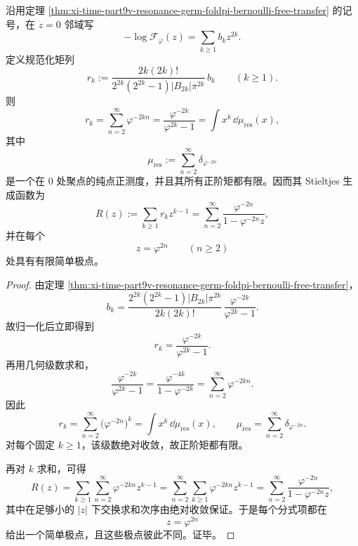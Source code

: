 \begin{theorem}\label{thm:xi-time-part9zb-resonance-purepoint-stieltjes-moment-characterization}
沿用定理 \ref{thm:xi-time-part9v-resonance-germ-foldpi-bernoulli-free-transfer} 的记号，在 \(z=0\) 邻域写
\[
-\log \mathcal F_\varphi(z)=\sum_{k\ge 1}b_k z^{2k}.
\]
定义规范化矩列
\[
r_k:=
\frac{2k(2k)!}{2^{2k}(2^{2k}-1)|B_{2k}|\pi^{2k}}\,b_k
\qquad (k\ge 1).
\]
则
\[
r_k
=
\sum_{n=2}^{\infty}\varphi^{-2kn}
=
\frac{\varphi^{-2k}}{\varphi^{2k}-1}
=
\int x^k\,\dd\mu_{\mathrm{res}}(x),
\]
其中
\[
\mu_{\mathrm{res}}
:=
\sum_{n=2}^{\infty}\delta_{\varphi^{-2n}}
\]
是一个在 \(0\) 处聚点的纯点正测度，并且其所有正阶矩都有限。因而其 Stieltjes 生成函数为
\[
R(z):=\sum_{k\ge 1}r_k z^{k-1}
=
\sum_{n=2}^{\infty}\frac{\varphi^{-2n}}{1-\varphi^{-2n}z},
\]
并在每个
\[
z=\varphi^{2n}
\qquad (n\ge 2)
\]
处具有有限简单极点。
\end{theorem}
\begin{proof}
由定理 \ref{thm:xi-time-part9v-resonance-germ-foldpi-bernoulli-free-transfer}，
\[
b_k=
\frac{2^{2k}(2^{2k}-1)|B_{2k}|\pi^{2k}}{2k(2k)!}\,
\frac{\varphi^{-2k}}{\varphi^{2k}-1}.
\]
故归一化后立即得到
\[
r_k=\frac{\varphi^{-2k}}{\varphi^{2k}-1}.
\]
再用几何级数求和，
\[
\frac{\varphi^{-2k}}{\varphi^{2k}-1}
=
\frac{\varphi^{-4k}}{1-\varphi^{-2k}}
=
\sum_{n=2}^{\infty}\varphi^{-2kn}.
\]
因此
\[
r_k=
\sum_{n=2}^{\infty}\bigl(\varphi^{-2n}\bigr)^k
=
\int x^k\,\dd\mu_{\mathrm{res}}(x),
\qquad
\mu_{\mathrm{res}}=\sum_{n=2}^{\infty}\delta_{\varphi^{-2n}}.
\]
对每个固定 \(k\ge 1\)，该级数绝对收敛，故正阶矩都有限。

再对 \(k\) 求和，可得
\[
R(z)
=
\sum_{k\ge 1}\sum_{n=2}^{\infty}\varphi^{-2kn}z^{k-1}
=
\sum_{n=2}^{\infty}\sum_{k\ge 1}\varphi^{-2kn}z^{k-1}
=
\sum_{n=2}^{\infty}\frac{\varphi^{-2n}}{1-\varphi^{-2n}z},
\]
其中在足够小的 \(|z|\) 下交换求和次序由绝对收敛保证。于是每个分式项都在
\[
z=\varphi^{2n}
\]
给出一个简单极点，且这些极点彼此不同。证毕。
\end{proof}


